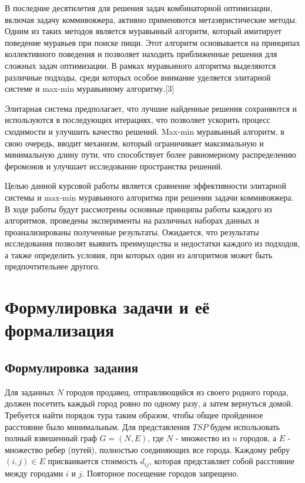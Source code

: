 \documentclass[14pt]{article}
\begin{document}
В последние десятилетия для решения задач комбинаторной оптимизации, включая задачу коммивояжера, активно применяются метаэвристические методы. Одним из таких методов является муравьиный алгоритм, который имитирует поведение муравьев при поиске пищи. Этот алгоритм основывается на принципах коллективного поведения и позволяет находить приближенные решения для сложных задач оптимизации. В рамках муравьиного алгоритма выделяются различные подходы, среди которых особое внимание уделяется элитарной системе и max-min муравьиному алгоритму.[3]

Элитарная система предполагает, что лучшие найденные решения сохраняются и используются в последующих итерациях, что позволяет ускорить процесс сходимости и улучшить качество решений. Max-min муравьиный алгоритм, в свою очередь, вводит механизм, который ограничивает максимальную и минимальную длину пути, что способствует более равномерному распределению феромонов и улучшает исследование пространства решений.

Целью данной курсовой работы является сравнение эффективности элитарной системы и max-min муравьиного алгоритма при решении задачи коммивояжера. В ходе работы будут рассмотрены основные принципы работы каждого из алгоритмов, проведены эксперименты на различных наборах данных и проанализированы полученные результаты. Ожидается, что результаты исследования позволят выявить преимущества и недостатки каждого из подходов, а также определить условия, при которых один из алгоритмов может быть предпочтительнее другого.

\newpage

\section{Формулировка задачи и её формализация}

\subsection{Формулировка задания}

Для заданных $N$ городов продавец, отправляющийся из своего
родного города, должен посетить каждый город ровно по одному разу, а затем вернуться домой. Требуется найти порядок тура таким образом, чтобы общее пройденное расстояние было минимальным. Для представления $TSP$ будем использовать полный взвешенный граф $G= (N, E)$, где $N$ - множество из $n$ городов, а $E$ - множество ребер (путей), полностью соединяющих все города. Каждому ребру $(i,j) \in E$ присваивается стоимость $d_{ij}$, которая представляет собой расстояние между городами $i$ и $j$. Повторное посещение городов запрещено.
\end{document}
